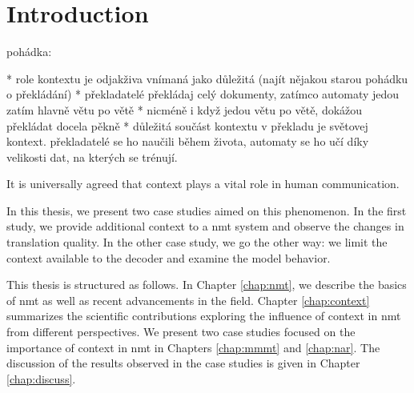 \chapter{Introduction}
\label{chap:intro}

\begin{markdown}

pohádka:

* role kontextu je odjakživa vnímaná jako důležitá (najít nějakou starou pohádku o překládání)
* překladatelé překládaj celý dokumenty, zatímco automaty jedou zatím hlavně větu po větě
* nicméně i když jedou větu po větě, dokážou překládat docela pěkně
* důležitá součást kontextu v překladu je světovej kontext. překladatelé se ho naučili během života, automaty se ho učí díky velikosti dat, na kterých se trénují.

\end{markdown}

It is universally agreed that context plays a vital role in human
communication.





In this thesis, we present two case studies aimed on this phenomenon. In the
first study, we provide additional context to a \gls{nmt} system and observe
the changes in translation quality. In the other case study, we go the other
way: we limit the context available to the decoder and examine the model
behavior.


This thesis is structured as follows. In Chapter \ref{chap:nmt}, we describe
the basics of \gls{nmt} as well as recent advancements in the field. Chapter
\ref{chap:context} summarizes the scientific contributions exploring the
influence of context in \gls{nmt} from different perspectives. We present two
case studies focused on the importance of context in \gls{nmt} in Chapters
\ref{chap:mmmt} and \ref{chap:nar}. The discussion of the results observed in
the case studies is given in Chapter \ref{chap:discuss}.
